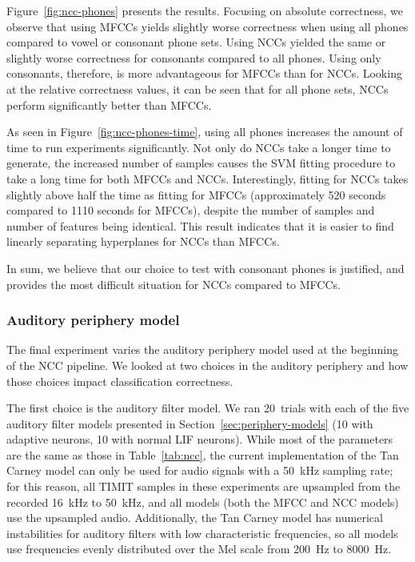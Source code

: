 Figure~\ref{fig:ncc-phones} presents the results.
Focusing on absolute correctness,
we observe that using MFCCs
yields slightly worse correctness
when using all phones compared
to vowel or consonant phone sets.
Using NCCs yielded the same
or slightly worse correctness
for consonants compared to all phones.
Using only consonants, therefore,
is more advantageous for MFCCs
than for NCCs.
Looking at the relative correctness values,
it can be seen that for all phone sets,
NCCs perform significantly better
than MFCCs.


As seen in Figure~\ref{fig:ncc-phones-time},
using all phones increases the
amount of time to run experiments significantly.
Not only do NCCs take a longer time to generate,
the increased number of samples
causes the SVM fitting procedure
to take a long time
for both MFCCs and NCCs.
Interestingly, fitting for NCCs
takes slightly above half
the time as fitting for MFCCs
(approximately 520 seconds
compared to 1110 seconds for MFCCs),
despite the number of samples
and number of features being identical.
This result indicates that it is
easier to find linearly separating hyperplanes
for NCCs than MFCCs.

In sum, we believe that our choice to
test with consonant phones
is justified,
and provides the most difficult
situation for NCCs compared to MFCCs.

\subsubsection{Auditory periphery model}
\label{sec:results-periphmodel}

The final experiment varies the auditory periphery model
used at the beginning of the NCC pipeline.
We looked at two choices in the auditory periphery
and how those choices impact classification correctness.

The first choice is the auditory filter model.
We ran 20~trials with each of the five
auditory filter models presented
in Section~\ref{sec:periphery-models}
(10 with adaptive neurons, 10 with normal LIF neurons).
While most of the parameters are the same
as those in Table~\ref{tab:ncc},
the current implementation of the Tan Carney model
can only be used for audio signals
with a 50~kHz sampling rate;
for this reason, all TIMIT samples
in these experiments
are upsampled from the recorded 16~kHz to 50~kHz,
and all models (both the MFCC and NCC models)
use the upsampled audio.
Additionally, the Tan Carney model
has numerical instabilities for auditory filters
with low characteristic frequencies,
so all models use frequencies
evenly distributed over the Mel scale
from 200~Hz to 8000~Hz.

